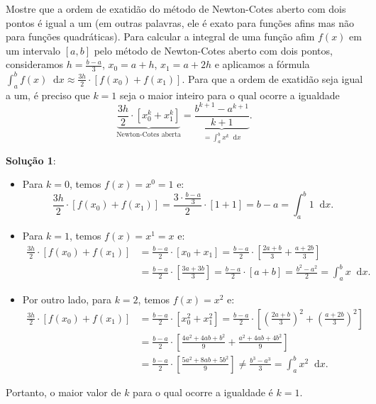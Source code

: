\documentclass[12pt,a4paper]{article}
\newcommand*\diff{\mathop{}\!\mathrm{d}}
\begin{document}
\begin{ExerciseList}
\Exercise[title={2,5}] Mostre que a ordem de exatidão do método de Newton-Cotes aberto com dois pontos é igual a um (em outras palavras, ele é exato para funções afins mas não para funções quadráticas).
\Answer Para calcular a integral de uma função afim $f(x)$ em um intervalo $[a, b]$ pelo método de Newton-Cotes aberto com dois pontos, consideramos $h = \frac{b - a}{3}$, $x_0 = a + h$, $x_1 = a + 2h$ e aplicamos a fórmula \(\int_a^b f(x) \diff{x} \approx \frac{3h}{2} \cdot \left[ f(x_0) + f(x_1) \right]\). Para que a ordem de exatidão seja igual a um, é preciso que $k = 1$ seja o maior inteiro para o qual ocorre a igualdade
\[
\underbrace{\frac{3h}{2} \cdot \left[ x_0^k + x_1^k \right]}_{\text{Newton-Cotes aberta}}
= \underbrace{\frac{b^{k+1} - a^{k+1}}{k+1}}_{= \int_a^b x^k \diff{x}}.
\]

\textbf{Solução 1}:

\begin{itemize}
\item Para $k = 0$, temos $f(x) = x^0 = 1$ e:
\[
\frac{3h}{2} \cdot \left[ f(x_0) + f(x_1) \right]
= \frac{3\cdot \frac{b - a}{3}}{2} \cdot \left[ 1 + 1 \right]
= b - a
= \int_a^b 1 \diff{x}.
\]
\item Para $k = 1$, temos $f(x) = x^1 = x$ e:
\begin{align*}
\frac{3h}{2} \cdot \left[ f(x_0) + f(x_1) \right]
& = \frac{b - a}{2} \cdot \left[ x_0 + x_1 \right]
  = \frac{b - a}{2} \cdot \left[ \frac{2a + b}{3} + \frac{a + 2b}{3}\right] \\
& = \frac{b - a}{2} \cdot \left[ \frac{3a + 3b}{3}\right]
  = \frac{b - a}{2} \cdot \left[ a + b\right]
  = \frac{b^2 - a^2}{2}
  = \int_a^b x \diff{x}.
\end{align*}
\item Por outro lado, para $k = 2$, temos $f(x) = x^2$ e:
\begin{align*}
\frac{3h}{2} \cdot \left[ f(x_0) + f(x_1) \right]
& = \frac{b - a}{2} \cdot \left[ x_0^2 + x_1^2 \right]
= \frac{b - a}{2} \cdot \left[ \left(\frac{2a + b}{3}\right)^2 + \left(\frac{a + 2b}{3}\right)^2 \right] \\
& = \frac{b - a}{2} \cdot \left[ \frac{4a^2 + 4ab+b^2}{9} + \frac{a^2 + 4ab + 4b^2}{9} \right]\\
& = \frac{b - a}{2} \cdot \left[ \frac{5a^2 + 8ab + 5b^2}{9}\right]
\neq \frac{b^3 - a^3}{3}
= \int_a^b x^2 \diff{x}.
\end{align*}
\end{itemize}
Portanto, o maior valor de $k$ para o qual ocorre a igualdade é $\boxed{k = 1}$.


\end{ExerciseList}
\end{document}
